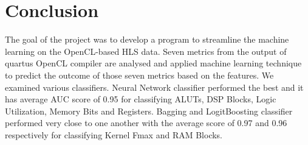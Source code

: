\chapter{Conclusion}
The goal of the project was to develop a program to streamline the machine learning on the OpenCL-based HLS data. Seven metrics from the output of quartus OpenCL compiler are analysed and applied machine learning technique to predict the outcome of those seven metrics based on the features. We examined various classifiers. Neural Network classifier performed the best and it has average AUC score of 0.95 for classifying ALUTs, DSP Blocks, Logic Utilization, Memory Bits and Registers. Bagging and LogitBoosting classifier performed very close to one another with the average score of 0.97 and 0.96 respectively for classifying Kernel Fmax and RAM Blocks.